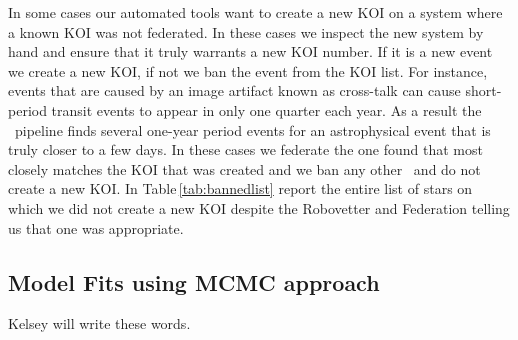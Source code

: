 In some cases our automated tools want to create a new KOI on a system where a known KOI was not federated.  In these cases we inspect the new system by hand and ensure that it truly warrants a new KOI number. If it is a new event we create a new KOI, if not we ban the event from the KOI list.  For instance, events that are caused by an image artifact known as cross-talk \citet{Coughlin2014a} can cause short-period transit events to appear in only one quarter each year. As a result the \Kepler\ pipeline finds several one-year period events for an astrophysical event that is truly closer to a few days.  In these cases we federate the one found that most closely matches the KOI that was created and we ban any other \opstce\ and do not create a new KOI.  In Table\,\ref{tab:bannedlist} report the entire list of stars on which we did not create a new KOI despite the Robovetter and Federation telling us that one was appropriate.


\subsection{Model Fits using MCMC approach}
\label{s:mcmc}
Kelsey will write these words.



